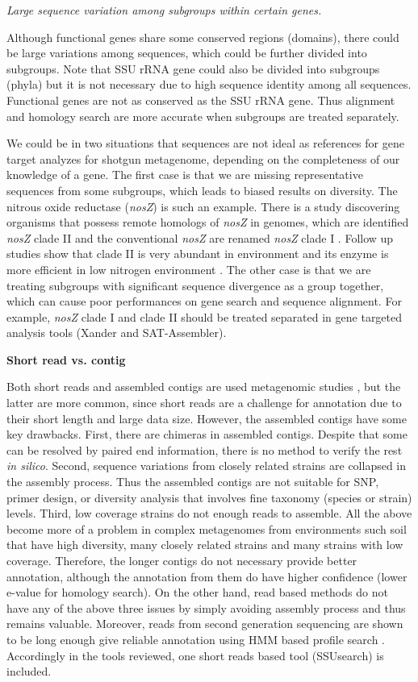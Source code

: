 \documentclass[]{msu-thesis}
\begin{document}
\textit{Large sequence variation among subgroups within certain genes. }

Although functional genes share some conserved regions (domains),
there could be large variations among sequences, which could be
further divided into subgroups. Note that SSU rRNA gene could also be
divided into subgroups (phyla) but it is not necessary due to high
sequence identity among all sequences. Functional genes are not as
conserved as the SSU rRNA gene. Thus alignment and homology search are
more accurate when subgroups are treated separately.

We could be in two situations that sequences are not ideal as
references for gene target analyzes for shotgun metagenome, depending
on the completeness of our knowledge of a gene. The first case is that
we are missing representative sequences from some subgroups, which
leads to biased results on diversity. The nitrous oxide reductase
(\textit{nosZ}) is such an example. There is a study discovering
organisms that possess remote homologs of \textit{nosZ} in genomes,
which are identified \textit{nosZ} clade II and the conventional
\textit{nosZ} are renamed \textit{nosZ} clade I
\cite{sanford_unexpected_2012}. Follow up studies show that clade II
is very abundant in environment and its enzyme is more efficient in
low nitrogen environment \cite{yoon_nitrous_2016}.  The other case is
that we are treating subgroups with significant sequence divergence as
a group together, which can cause poor performances on gene search and
sequence alignment. For example, \textit{nosZ} clade I and clade II
should be treated separated in gene targeted analysis tools (Xander
and SAT-Assembler).

\textbf{Short read vs. contig }

Both short reads and assembled contigs are used metagenomic studies
\cite{fierer_cross-biome_2012,qin_human_2010,howe_tackling_2014}, but
the latter are more common, since short reads are a challenge for
annotation due to their short length and large data size. However, the
assembled contigs have some key drawbacks. First, there are chimeras
in assembled contigs. Despite that some can be resolved by paired end
information, there is no method to verify the rest \textit{in
  silico}. Second, sequence variations from closely related strains
are collapsed in the assembly process. Thus the assembled contigs are
not suitable for SNP, primer design, or diversity analysis that
involves fine taxonomy (species or strain) levels. Third, low coverage
strains do not enough reads to assemble. All the above become more of
a problem in complex metagenomes from environments such soil that have
high diversity, many closely related strains and many strains with low
coverage. Therefore, the longer contigs do not necessary provide
better annotation, although the annotation from them do have higher
confidence (lower e-value for homology search). On the other hand,
read based methods do not have any of the above three issues by simply
avoiding assembly process and thus remains valuable. Moreover, reads
from second generation sequencing are shown to be long enough give
reliable annotation using HMM based profile search
\cite{zhang_metadomain:_2012}. Accordingly in the tools reviewed, one
short reads based tool (SSUsearch) is included.
\end{document}
